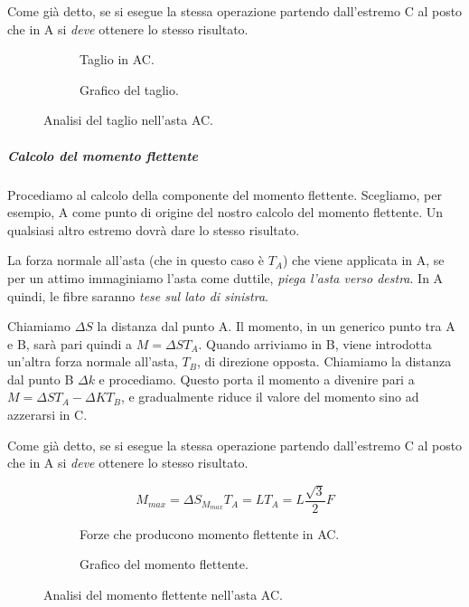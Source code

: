 \documentclass[main.tex]{subfiles}
\begin{document}
Come già detto, se si esegue la stessa operazione partendo dall'estremo C al posto che in A si \textit{deve} ottenere lo stesso risultato.

\begin{figure}[!tbp]
  \begin{subfigure}[b]{.5\textwidth}
  \centering
  \resizebox{.5\textwidth}{!}{}
  \caption{Taglio in AC.}
  \end{subfigure}
  \hfill
  \begin{subfigure}[b]{.5\textwidth}
  \centering
  \resizebox{.5\textwidth}{!}{}
  \caption{Grafico del taglio.}
  \end{subfigure}
  \caption{Analisi del taglio nell'asta AC.}
\end{figure}

\subparagraph{Calcolo del momento flettente}
Procediamo al calcolo della componente del momento flettente. Scegliamo, per esempio, A come punto di origine del nostro calcolo del momento flettente. Un qualsiasi altro estremo dovrà dare lo stesso risultato.

La forza normale all'asta (che in questo caso è $T_A$) che viene applicata in A, se per un attimo immaginiamo l'asta come duttile, \textit{piega l'asta verso destra}. In A quindi, le fibre saranno \textit{tese sul lato di sinistra}.

Chiamiamo $\Delta{S}$ la distanza dal punto A. Il momento, in un generico punto tra A e B, sarà pari quindi a $M = \Delta{S}T_A$. Quando arriviamo in B, viene introdotta un'altra forza normale all'asta, $T_B$, di direzione opposta. Chiamiamo la distanza dal punto B $\Delta{k}$ e procediamo. Questo porta il momento a divenire pari a $M = \Delta{S}T_A - \Delta{K}T_B$, e gradualmente riduce il valore del momento sino ad azzerarsi in C.

Come già detto, se si esegue la stessa operazione partendo dall'estremo C al posto che in A si \textit{deve} ottenere lo stesso risultato.

\[
	M_{max} = \Delta{S}_{M_{max}}T_A = LT_A = L\frac{\sqrt{3}}{2}F
\]

\begin{figure}[!tbp]
  \begin{subfigure}[b]{.5\textwidth}
  \centering
  \resizebox{.5\textwidth}{!}{}
  \caption{Forze che producono momento flettente in AC.}
  \end{subfigure}
  \hfill
  \begin{subfigure}[b]{.5\textwidth}
  \centering
  \resizebox{.5\textwidth}{!}{}
  \caption{Grafico del momento flettente.}
  \end{subfigure}
  \caption{Analisi del momento flettente nell'asta AC.}
\end{figure}
\end{document}
